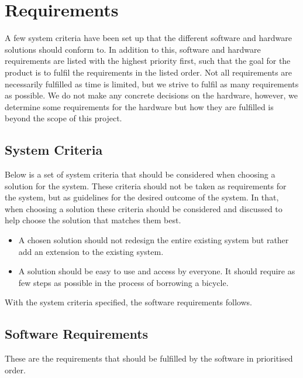 \section{Requirements}
A few system criteria have been set up that the different software and hardware solutions should conform to. 
In addition to this, software and hardware requirements are listed with the highest priority first, such that the goal for the product is to fulfil the requirements in the listed order. 
Not all requirements are necessarily fulfilled as time is limited, but we strive to fulfil as many requirements as possible.
We do not make any concrete decisions on the hardware, however, we determine some requirements for the hardware but how they are fulfilled is beyond the scope of this project.

\subsection{System Criteria}\label{sec:systemCriteria}
Below is a set of system criteria that should be considered when choosing a solution for the system.
These criteria should not be taken as requirements for the system, but as guidelines for the desired outcome of the system.
In that, when choosing a solution these criteria should be considered and discussed to help choose the solution that matches them best.

\begin{itemize}
	\item A chosen solution should not redesign the entire existing system but rather add an extension to the existing system.
	\item A solution should be easy to use and access by everyone. 
	It should require as few steps as possible in the process of borrowing a bicycle.
\end{itemize}

With the system criteria specified, the software requirements follows.

\subsection{Software Requirements}
These are the requirements that should be fulfilled by the software in prioritised order.

